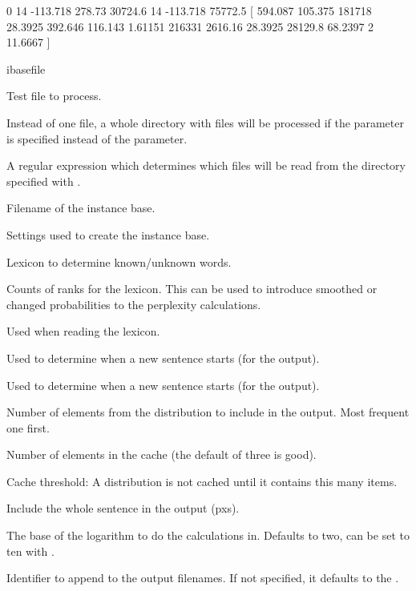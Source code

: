 \documentclass[a4paper,10pt,twoside]{report}
\begin{document}
\begin{wout}{}
0 14 -113.718 278.73 30724.6 14 -113.718 75772.5 [ 594.087 105.375
                     181718 28.3925 392.646 116.143 1.61151 216331
                     2616.16 28.3925 28129.8 68.2397 2 11.6667 ]
\end{wout}

\begin{varlist}{ibasefile}
\item[filename] Test file to process.
\item[dir] Instead of one file, a whole directory with files will be
  processed if the  parameter is specified instead of the
   parameter.
\item[dirmatch] A regular expression which determines which files will
  be read from the directory specified with .
\item[ibasefile] Filename of the instance base.
\item[timbl] Settings used to create the instance base.
\item[lexicon] Lexicon to determine known/unknown words.
\item[counts] Counts of ranks for the lexicon. This can be used to
  introduce smoothed or changed probabilities to the perplexity
  calculations. 
\item[hapax] Used when reading the lexicon.
\item[lc] Used to determine when a new sentence starts (for the
   output).
\item[rc] Used to determine when a new sentence starts (for the
   output). 
\item[topn] Number of elements from the \Timbl{} distribution to
  include in the output. Most frequent one first.
\item[cache] Number of elements in the cache (the default of three is
  good). 
\item[cth] Cache threshold: A distribution is not cached until it
  contains this many items.
\item[is] Include the whole sentence in the output (pxs).
\item[log] The base of the logarithm to do the calculations
  in. Defaults to two, can be set to ten with .
\item[id] Identifier to append to the output filenames. If not
  specified, it defaults to the \pid{}.
\end{varlist}

\subsection{}
\end{document}
